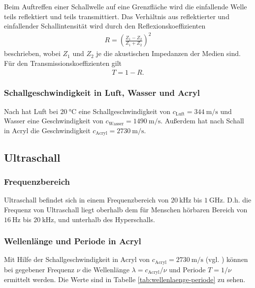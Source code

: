 \noindent
Beim Auftreffen einer Schallwelle auf eine Grenzfläche wird die einfallende Welle teils reflektiert und teils transmittiert.
Das Verhältnis aus reflektierter und einfallender Schallintensität wird durch den Reflexionskoeffizienten 
\begin{align}
    R = \left(\frac{Z_1 - Z_2}{Z_1 + Z_2}\right)^2
    \label{eq:reflexion}
\end{align}
beschrieben, wobei $Z_1$ und $Z_2$ je die akustischen Impedanzen der Medien sind.
Für den Transmissionskoeffizienten gilt 
\begin{align}
    T = 1 - R.
    \label{eq:transmission}
\end{align}


\subsubsection{Schallgeschwindigkeit in Luft, Wasser und Acryl}
\label{sec:schallgeschwindigkeit}
Nach \cite[]{schall-wasser-luft} hat Luft bei $\qty[]{20}{\celsius}$ eine Schallgeschwindigkeit von $c_\text{Luft} = \qty[]{344}{\meter\per\second}$
und Wasser eine Geschwindigkeit von $c_\text{Wasser} = \qty[]{1490}{\meter\per\second}$.
Außerdem hat nach \cite[]{schall-acryl} Schall in Acryl die Geschwindigkeit $c_\text{Acryl} = \qty[]{2730}{\meter\per\second}$.



\subsection{Ultraschall}

\subsubsection{Frequenzbereich}
Ultraschall befindet sich in einem Frequenzbereich von $\qty[]{20}{\kilo\hertz}$ bis $\qty[]{1}{\giga\hertz}$.
D.h. die Frequenz von Ultraschall liegt oberhalb dem für Menschen hörbaren Bereich von $\qty[]{16}{\hertz}$ bis $\qty[]{20}{\kilo\hertz}$,
und unterhalb des Hyperschalls.

\subsubsection{Wellenlänge und Periode in Acryl}
Mit Hilfe der Schallgeschwindigkeit in Acryl von $c_\text{Acryl} = \qty[]{2730}{\meter\per\second}$ (vgl. \cite[]{schall-acryl})
können bei gegebener Frequenz $\nu$ die Wellenlänge $\lambda  = c_\text{Acryl} / \nu$ und Periode $T = 1 / \nu$ ermittelt werden.
Die Werte sind in Tabelle \ref{tab:wellenlaenge-periode} zu sehen.

